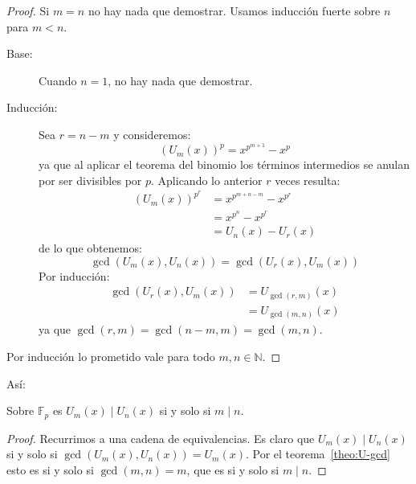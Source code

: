   \begin{proof}
    Si \(m = n\) no hay nada que demostrar.
    Usamos inducción fuerte sobre \(n\) para \(m < n\).%
    \begin{description}
    \item[Base:]
      Cuando \(n = 1\),
      no hay nada que demostrar.
    \item[Inducción:]
      Sea \(r = n - m\)
      y consideremos:
      \begin{equation*}
	\left( U_m (x) \right)^p
	  = x^{p^{m + 1}} - x^p
      \end{equation*}
      ya que al aplicar el teorema del binomio%
      los términos intermedios
      se anulan por ser divisibles por \(p\).
      Aplicando lo anterior \(r\) veces resulta:
      \begin{align*}
	\left( U_m (x) \right)^{p^r}
	  &= x^{p^{m + n - m}} - x^{p^r} \\
	  & = x^{p^n} - x^{p^r} \\
	  &= U_n (x) - U_r (x)
      \end{align*}
      de lo que obtenemos:
      \begin{equation*}
	\gcd(U_m (x), U_n (x))
	  = \gcd(U_r (x), U_m (x))
      \end{equation*}
      Por inducción:
      \begin{align*}
	\gcd(U_r (x), U_m (x))
	  &= U_{\gcd(r, m)} (x) \\
	  &= U_{\gcd(m, n)} (x)
      \end{align*}
      ya que \(\gcd(r, m) = \gcd(n - m, m) = \gcd(m, n)\).
    \end{description}
    Por inducción
    lo prometido vale para todo \(m, n \in \mathbb{N}\).
  \end{proof}
  Así:
  \begin{corollary}
    \label{cor:U-divides}
    Sobre\/ \(\mathbb{F}_p\) es
    \(U_m (x) \mid U_n (x)\) si y solo si \(m \mid n\).
  \end{corollary}
  \begin{proof}
    Recurrimos a una cadena de equivalencias.
    Es claro que \(U_m (x) \mid U_n (x)\)
    si y solo si \(\gcd(U_m (x), U_n (x)) = U_m (x)\).
    Por el teorema~\ref{theo:U-gcd}
    esto es si y solo si \(\gcd(m, n) = m\),
    que es si y solo si \(m \mid n\).
  \end{proof}

